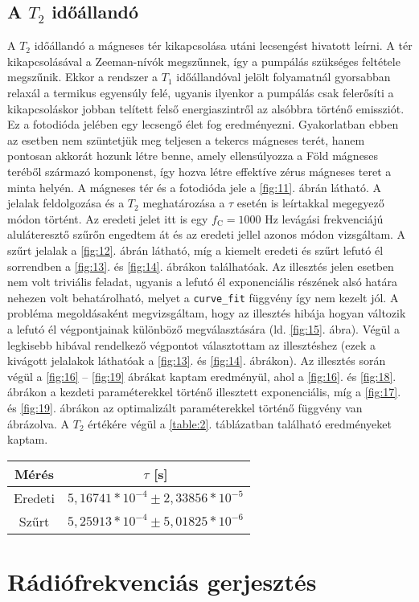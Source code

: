 \begin{multicols}{2}
\subsection{A $T_{2}$ időállandó}
A $T_{2}$ időállandó a mágneses tér kikapcsolása utáni lecsengést hivatott leírni. A tér kikapcsolásával a Zeeman-nívók megszűnnek, így a pumpálás szükséges feltétele megszűnik. Ekkor a rendszer a $T_{1}$ időállandóval jelölt folyamatnál gyorsabban relaxál a termikus egyensúly felé, ugyanis ilyenkor a pumpálás csak felerősíti a kikapcsoláskor jobban telített felső energiaszintről az alsóbbra történő emissziót. Ez a fotodióda jelében egy lecsengő élet fog eredményezni. Gyakorlatban ebben az esetben nem szüntetjük meg teljesen a tekercs mágneses terét, hanem pontosan akkorát hozunk létre benne, amely ellensúlyozza a Föld mágneses teréből származó komponenst, így hozva létre effektíve zérus mágneses teret a minta helyén. \newline
A mágneses tér és a fotodióda jele a \ref{fig:11}. ábrán látható. A jelalak feldolgozása és a $T_{2}$ meghatározása a $\tau$ esetén is leírtakkal megegyező módon történt. Az eredeti jelet itt is egy $f_{\text{C}} = 1000$ Hz levágási frekvenciájú aluláteresztő szűrőn engedtem át és az eredeti jellel azonos módon vizsgáltam. A szűrt jelalak a \ref{fig:12}. ábrán látható, míg a kiemelt eredeti és szűrt lefutó él sorrendben a \ref{fig:13}. és \ref{fig:14}. ábrákon találhatóak. \newline
Az illesztés jelen esetben nem volt triviális feladat, ugyanis a lefutó él exponenciális részének alsó határa nehezen volt behatárolható, melyet a \texttt{curve\_fit} függvény így nem kezelt jól. A probléma megoldásaként megvizsgáltam, hogy az illesztés hibája hogyan változik a lefutó él végpontjainak különböző megválasztására (ld. \ref{fig:15}. ábra). Végül a legkisebb hibával rendelkező végpontot választottam az illesztéshez (ezek a kivágott jelalakok láthatóak a \ref{fig:13}. és \ref{fig:14}. ábrákon). Az illesztés során végül a \ref{fig:16} -- \ref{fig:19} ábrákat kaptam eredményül, ahol a \ref{fig:16}. és \ref{fig:18}. ábrákon a kezdeti paraméterekkel történő illesztett exponenciális, míg a \ref{fig:17}. és \ref{fig:19}. ábrákon az optimalizált paraméterekkel történő függvény van ábrázolva. \newline
A $T_{2}$ értékére végül a \ref{table:2}. táblázatban található eredményeket kaptam.

\begin{center}
\begin{tabular}{|c|c|}
\hline
Mérés            & $\tau$ [s]                                \\ \hline
Eredeti          & $5,16741 * 10^{-4} \pm 2,33856 * 10^{-5}$ \\ \hline
Szűrt            & $5,25913 * 10^{-4} \pm 5,01825 * 10^{-6}$ \\ \hline
\end{tabular}
 \label{table:2}
\end{center}

\section{Rádiófrekvenciás gerjesztés}

\end{multicols}